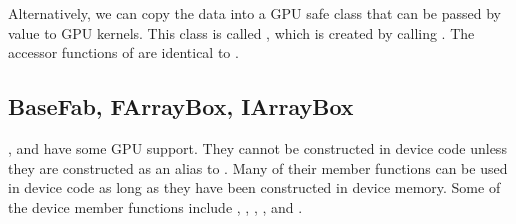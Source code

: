 \documentclass[letterpaper,10pt,english]{sphinxmanual}
\begin{document}
\begin{sphinxVerbatim}[commandchars=\\\{\}]
    
    
    
    
    
\end{sphinxVerbatim}

\sphinxAtStartPar
Alternatively, we can copy the data into a GPU safe class that can be
passed by value to GPU kernels. This class is called
, which is created by calling
.  The accessor functions of
 are identical to .


\subsection{BaseFab, FArrayBox, IArrayBox}
\label{\detokenize{GPU:basefab-farraybox-iarraybox}}\label{\detokenize{GPU:sec-gpu-classes-basefab}}
\sphinxAtStartPar
{},  and  have some GPU
support.  They cannot be constructed in device code unless they are
constructed as an alias to .  Many of their member
functions can be used in device code as long as they have been
constructed in device memory. Some of the device member functions
include , , , , and
.
\end{document}
